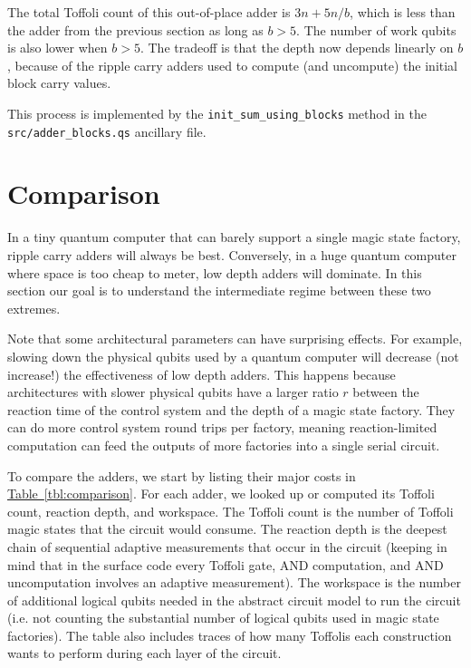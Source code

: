 \documentclass[onecolumn,unpublished]{quantumarticle}
\theoremstyle{definition}
\theoremstyle{definition}
\theoremstyle{definition}
\newcommand{\tbl}[1]{\hyperref[tbl:#1]{Table~\ref*{tbl:#1}}}
\begin{document}
The total Toffoli count of this out-of-place adder is $3n + 5n/b$, which is less than the adder from the previous section as long as $b > 5$.
The number of work qubits is also lower when $b > 5$.
The tradeoff is that the depth now depends linearly on $b$, because of the ripple carry adders used to compute (and uncompute) the initial block carry values.

This process is implemented by the \texttt{init\_sum\_using\_blocks} method in the \\\texttt{src/adder\_blocks.qs} ancillary file.


\section{Comparison}
\label{sec:estimate}

In a tiny quantum computer that can barely support a single magic state factory, ripple carry adders will always be best.
Conversely, in a huge quantum computer where space is too cheap to meter, low depth adders will dominate.
In this section our goal is to understand the intermediate regime between these two extremes.

Note that some architectural parameters can have surprising effects.
For example, slowing down the physical qubits used by a quantum computer will decrease (not increase!) the effectiveness of low depth adders.
This happens because architectures with slower physical qubits have a larger ratio $r$ between the reaction time of the control system and the depth of a magic state factory.
They can do more control system round trips per factory, meaning reaction-limited computation can feed the outputs of more factories into a single serial circuit.

To compare the adders, we start by listing their major costs in \tbl{comparison}.
For each adder, we looked up or computed its Toffoli count, reaction depth, and workspace.
The Toffoli count is the number of Toffoli magic states that the circuit would consume.
The reaction depth is the deepest chain of sequential adaptive measurements that occur in the circuit (keeping in mind that in the surface code every Toffoli gate, AND computation, and AND uncomputation involves an adaptive measurement).
The workspace is the number of additional logical qubits needed in the abstract circuit model to run the circuit (i.e. not counting the substantial number of logical qubits used in magic state factories).
The table also includes traces of how many Toffolis each construction wants to perform during each layer of the circuit.
\end{document}
